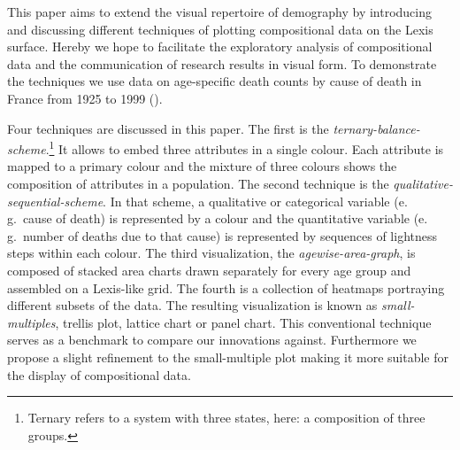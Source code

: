 \documentclass[parskip=half]{scrartcl}
\begin{document}
This paper aims to extend the visual repertoire of demography by introducing and discussing different techniques of plotting compositional data on the Lexis surface. Hereby we hope to facilitate the exploratory analysis of compositional data and the communication of research results in visual form. To demonstrate the techniques we use data on age-specific death counts by cause of death in France from 1925 to 1999 (\cite{Vallin2014}).

Four techniques are discussed in this paper. The first is the \emph{ternary-balance-scheme}.\footnote{
  Ternary refers to a system with three states, here: a composition of three groups.
}
It allows to embed three attributes in a single colour. Each attribute is mapped to a primary colour and the mixture of three colours shows the composition of attributes in a population. The second technique is the \emph{qualitative-sequential-scheme}. In that scheme, a qualitative or categorical variable (e.\,g.~cause of death) is represented by a colour and the quantitative variable (e.\,g.~number of deaths due to that cause) is represented by sequences of lightness steps within each colour. The third visualization, the \emph{agewise-area-graph}, is composed of stacked area charts drawn separately for every age group and assembled on a Lexis-like grid. The fourth is a collection of heatmaps portraying different subsets of the data. The resulting visualization is known as \emph{small-multiples}, trellis plot, lattice chart or panel chart. This conventional technique serves as a benchmark to compare our innovations against. Furthermore we propose a slight refinement to the small-multiple plot making it more suitable for the display of compositional data.
\end{document}
